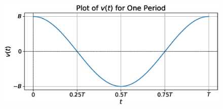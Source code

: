 \documentclass[12pt,a4paper]{article}
\begin{document}
\begin{figure}[h!]
    \centering
    \includegraphics[width=0.9\linewidth]{figs/fig_sol_1.4b.eps}  %
\end{figure}
\end{document}
